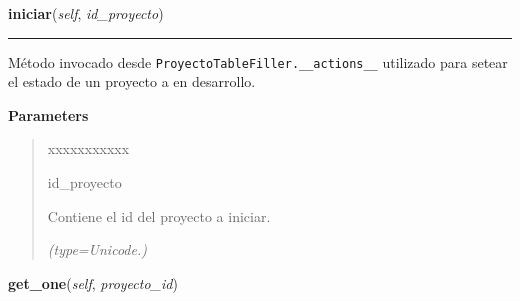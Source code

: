 \hspace{.8\funcindent}\begin{boxedminipage}{\funcwidth}

    \raggedright \textbf{iniciar}(\textit{self}, \textit{id\_proyecto})

    \vspace{-1.5ex}

    \rule{\textwidth}{0.5\fboxrule}
\setlength{\parskip}{2ex}
    Método invocado desde \texttt{ProyectoTableFiller.\_\_actions\_\_} 
    utilizado para setear el estado de un proyecto a en desarrollo.

\setlength{\parskip}{1ex}
      \textbf{Parameters}
      \vspace{-1ex}

      \begin{quote}
        \begin{Ventry}{xxxxxxxxxxx}

          \item[id\_proyecto]

          Contiene el id del proyecto a iniciar.

            {\it (type=Unicode.)}

        \end{Ventry}

      \end{quote}

    \end{boxedminipage}

    \label{saip:controllers:proyecto_controller:ProyectoController:get_one}

    \vspace{0.5ex}

\hspace{.8\funcindent}\begin{boxedminipage}{\funcwidth}

    \raggedright \textbf{get\_one}(\textit{self}, \textit{proyecto\_id})

\setlength{\parskip}{2ex}
\setlength{\parskip}{1ex}
    \end{boxedminipage}

    \label{saip:controllers:proyecto_controller:ProyectoController:get_all}

